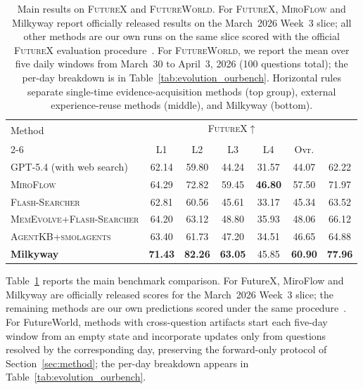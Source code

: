 \begin{table}[t]
\centering
\small
\setlength{\tabcolsep}{4.2pt}
\caption{Main results on \textsc{FutureX} and \textsc{FutureWorld}. For \textsc{FutureX}, \textsc{MiroFlow} and Milkyway report officially released results on the March~2026 Week~3 slice; all other methods are our own runs on the same slice scored with the official \textsc{FutureX} evaluation procedure~\citep{zeng2025futurex}. For \textsc{FutureWorld}, we report the mean over five daily windows from March~30 to April~3, 2026 (100 questions total); the per-day breakdown is in Table~\ref{tab:evolution_ourbench}. Horizontal rules separate single-time evidence-acquisition methods (top group), external experience-reuse methods (middle), and Milkyway (bottom).}
\label{tab:prediction_results}
\begin{tabular}{l ccccc c}
\toprule
\multirow{2}{*}{Method}
  & \multicolumn{5}{c}{\textsc{FutureX}$\uparrow$}
  & \makecell{\textsc{FutureWorld} \\ Score$\uparrow$} \\
\cmidrule(lr){2-6}
  & L1 & L2 & L3 & L4 & Ovr. & \\
\midrule
GPT-5.4 (with web search)         & 62.14 & 59.80 & 44.24 & 31.57 & 44.07 & 62.22 \\
\textsc{MiroFlow}                 & 64.29 & 72.82 & 59.45 & \textbf{46.80} & 57.50 & 71.97 \\
\textsc{Flash-Searcher}           & 62.81 & 60.56 & 45.61 & 33.17 & 45.34 & 63.52 \\
\midrule
\textsc{MemEvolve+Flash-Searcher} & 64.20 & 63.12 & 48.80 & 35.93 & 48.06 & 66.12 \\
\textsc{AgentKB+smolagents}       & 63.40 & 61.73 & 47.20 & 34.51 & 46.65 & 64.88 \\
\midrule
\textbf{Milkyway}                 & \textbf{71.43} & \textbf{82.26} & \textbf{63.05} & 45.85 & \textbf{60.90} & \textbf{77.96} \\
\bottomrule
\end{tabular}
\end{table}

Table~\ref{tab:prediction_results} reports the main benchmark comparison. For FutureX, MiroFlow and Milkyway are officially released scores for the March~2026 Week~3 slice; the remaining methods are our own predictions scored under the same procedure~\citep{zeng2025futurex}. For FutureWorld, methods with cross-question artifacts start each five-day window from an empty state and incorporate updates only from questions resolved by the corresponding day, preserving the forward-only protocol of Section~\ref{sec:method}; the per-day breakdown appears in Table~\ref{tab:evolution_ourbench}.

